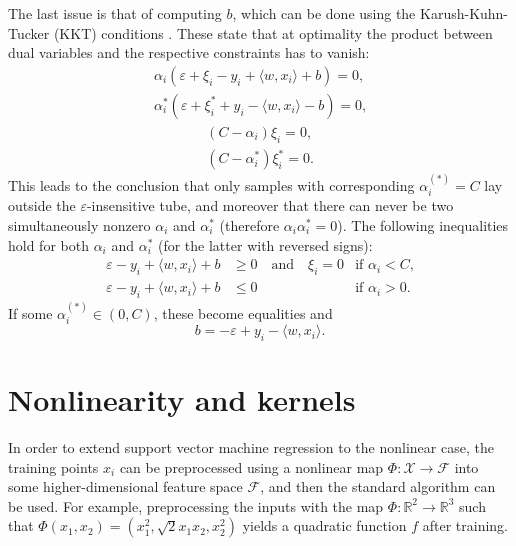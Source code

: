 \documentclass[12pt]{report}
\begin{document}
The last issue is that of computing $b$, which can be done using the Karush-Kuhn-Tucker (KKT) conditions \cite{karush39,kuhntucker51}. These state that at optimality the product between dual variables and the respective constraints has to vanish:
\begin{equation} \label{kkt1}
\begin{split}
\alpha_{i}(\varepsilon + \xi_{i} - y_{i} + \langle w,x_{i}\rangle + b) = 0 \text{,}\\
\alpha_{i}^{*}(\varepsilon + \xi_{i}^{*} + y_{i} - \langle w,x_{i}\rangle - b) = 0 \text{,}
\end{split}
\end{equation}
\begin{equation} \label{kkt2}
\begin{split}
(C - \alpha_{i})\xi_{i} = 0 \text{,}\\
(C - \alpha_{i}^{*})\xi_{i}^{*} = 0 \text{.}
\end{split}
\end{equation}
This leads to the conclusion that only samples with corresponding  $\alpha_{i}^{(*)}=C$ lay outside the $\varepsilon$-insensitive tube, and moreover that there can never be two simultaneously nonzero $\alpha_{i}$ and $\alpha_{i}^{*}$ (therefore $\alpha_{i}\alpha_{i}^{*} = 0$). The following inequalities hold for both $\alpha_{i}$ and $\alpha_{i}^{*}$ (for the latter with reversed signs):
\begin{align}
\label{compb1}
\varepsilon - y_{i} + \langle w,x_{i}\rangle + b &\geq 0 \quad \text{and} \quad \xi_{i}=0 &\text{if } \alpha_{i} < C \text{,}\\
\label{compb2}
\varepsilon - y_{i} + \langle w,x_{i}\rangle + b &\leq 0 &\text{if } \alpha_{i} > 0 \text{.}
\end{align}
If some $\alpha_{i}^{(*)} \in (0,C)$, these become equalities and
\begin{equation} \label{compb3}
b = - \varepsilon + y_{i} - \langle w,x_{i}\rangle \text{.}
\end{equation}

\section{Nonlinearity and kernels}
In order to extend support vector machine regression to the nonlinear case, the training points $ x_{i} $ can be preprocessed using a nonlinear map $ \Phi : \mathcal{X} \rightarrow \mathcal{F} $ into some higher-dimensional feature space $ \mathcal{F} $, and then the standard algorithm can be used. For example, preprocessing the inputs with the map $ \Phi : \mathbb{R}^{2} \rightarrow \mathbb{R}^{3} $ such that $ \Phi(x_{1},x_{2}) = (x_{1}^{2},\sqrt{2}x_{1}x_{2},x_{2}^{2}) $ yields a quadratic function $ f $ after training.
\end{document}
